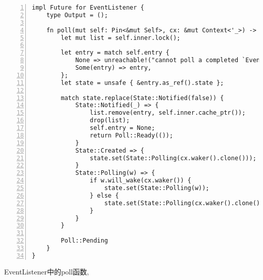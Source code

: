 \begin{lstlisting}[caption=Event的事件监听机制, numbers=left]
impl Future for EventListener {
    type Output = ();

    fn poll(mut self: Pin<&mut Self>, cx: &mut Context<'_>) -> Poll<Self::Output> {
        let mut list = self.inner.lock();

        let entry = match self.entry {
            None => unreachable!("cannot poll a completed `EventListener` future"),
            Some(entry) => entry,
        };
        let state = unsafe { &entry.as_ref().state };

        match state.replace(State::Notified(false)) {
            State::Notified(_) => {
                list.remove(entry, self.inner.cache_ptr());
                drop(list);
                self.entry = None;
                return Poll::Ready(());
            }
            State::Created => {
                state.set(State::Polling(cx.waker().clone()));
            }
            State::Polling(w) => {
                if w.will_wake(cx.waker()) {
                    state.set(State::Polling(w));
                } else {
                    state.set(State::Polling(cx.waker().clone()));
                }
            }
        }

        Poll::Pending
    }
}
\end{lstlisting}

EventListener中的poll函数, 
